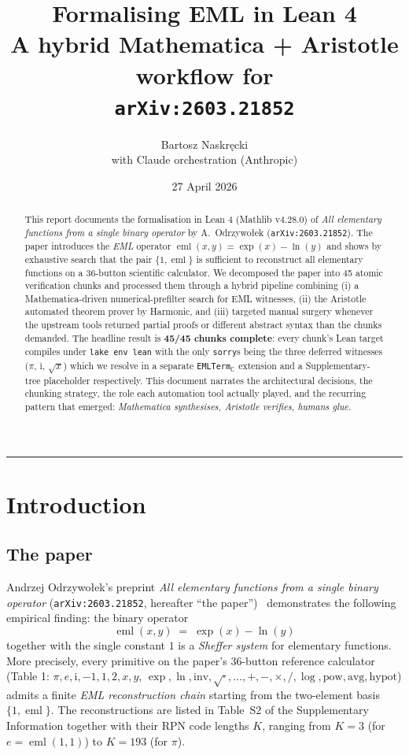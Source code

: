 \documentclass[11pt,a4paper]{article}
\title{\Large\textbf{Formalising EML in Lean 4}\\[2pt]
       \large A hybrid Mathematica + Aristotle workflow for\\
       \texttt{arXiv:2603.21852}}
\author{Bartosz Naskręcki\\
        \small with Claude orchestration (Anthropic)}
\date{27 April 2026}
\theoremstyle{plain}
\theoremstyle{definition}
\newcommand{\eml}{\operatorname{eml}}
\newcommand{\C}{\mathbb{C}}
\newcommand{\imu}{\mathrm{i}}
\begin{document}
\maketitle

\begin{abstract}
This report documents the formalisation in Lean 4 (Mathlib v4.28.0) of
\emph{All elementary functions from a single binary operator} by
A.~Odrzywo\l{}ek (\texttt{arXiv:2603.21852}).  The paper introduces the
\emph{EML} operator $\eml(x,y)=\exp(x)-\ln(y)$ and shows by exhaustive search
that the pair $\{1,\eml\}$ is sufficient to reconstruct all elementary
functions on a $36$-button scientific calculator.  We decomposed the paper
into 45 atomic verification chunks and processed them through a hybrid
pipeline combining (i) a Mathematica-driven numerical-prefilter search for
EML witnesses, (ii) the Aristotle automated theorem prover by Harmonic, and
(iii) targeted manual surgery whenever the upstream tools returned partial
proofs or different abstract syntax than the chunks demanded.  The headline
result is \textbf{45/45 chunks complete}: every chunk's Lean target compiles
under \texttt{lake env lean} with the only \texttt{sorry}s being the three
deferred witnesses ($\pi$, $\imu$, $\sqrt{x}$) which we resolve in a separate
\texttt{EMLTerm}$_\C$ extension and a Supplementary-tree placeholder
respectively.  This document narrates the architectural decisions, the
chunking strategy, the role each automation tool actually played, and the
recurring pattern that emerged: \emph{Mathematica synthesises, Aristotle
verifies, humans glue.}
\end{abstract}

\tableofcontents
\bigskip\hrule\bigskip

\section{Introduction}\label{sec:intro}

\subsection{The paper}

Andrzej Odrzywo\l{}ek's preprint \emph{All elementary functions from a
single binary operator} (\texttt{arXiv:2603.21852}, hereafter
``the paper'')~\cite{odrzywolek2026eml} demonstrates the following empirical
finding: the binary operator
\[
   \eml(x,y) \;=\; \exp(x) - \ln(y)
\]
together with the single constant $1$ is a \emph{Sheffer system} for
elementary functions.  More precisely, every primitive on the paper's
36-button reference calculator (Table 1: $\pi,e,\imu,-1,1,2,x,y$,
$\exp,\ln,\mathrm{inv},\sqrt{\cdot},\dots,+,-,\times,/,\log,\mathrm{pow},
\mathrm{avg},\mathrm{hypot}$) admits a finite \emph{EML reconstruction
chain} starting from the two-element basis $\{1,\eml\}$.  The
reconstructions are listed in Table~S2 of the Supplementary Information
together with their RPN code lengths $K$, ranging from
$K=3$ (for $e=\eml(1,1)$) to $K=193$ (for $\pi$).
\end{document}
